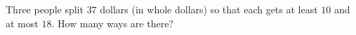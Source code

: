 Three people split $37$ dollars (in whole dollars) so that each gets at least $10$ and at most $18$. How many ways are there?
